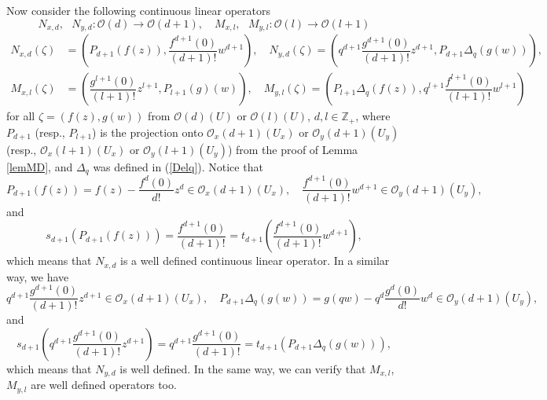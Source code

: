 \documentclass[12pt,reqno]{amsart}%
\theoremstyle{plain}
\numberwithin{theorem}{section} \numberwithin{equation}{section}
\numberwithin{lemma}{section}
\numberwithin{remark}{section}
\numberwithin{example}{section}
\numberwithin{proposition}{section}
\numberwithin{definition}{section}
\numberwithin{corollary}{section}
\begin{document}
Now consider the following continuous linear operators
\begin{equation}
N_{x,d},\text{ }N_{y,d}:\mathcal{O}\left(  d\right)  \rightarrow
\mathcal{O}\left(  d+1\right)  ,\quad M_{x,l},\text{ }M_{y,l}:\mathcal{O}%
\left(  l\right)  \rightarrow\mathcal{O}\left(  l+1\right)  \label{Nd}%
\end{equation}%
\begin{align*}
N_{x,d}\left(  \zeta\right)   &  =\left(  P_{d+1}\left(  f\left(  z\right)
\right)  ,\dfrac{f^{d+1}\left(  0\right)  }{\left(  d+1\right)  !}%
w^{d+1}\right)  ,\quad N_{y,d}\left(  \zeta\right)  =\left(  q^{d+1}%
\dfrac{g^{d+1}\left(  0\right)  }{\left(  d+1\right)  !}z^{d+1},P_{d+1}%
\Delta_{q}\left(  g\left(  w\right)  \right)  \right)  ,\\
M_{x,l}\left(  \zeta\right)   &  =\left(  \dfrac{g^{l+1}\left(  0\right)
}{\left(  l+1\right)  !}z^{l+1},P_{l+1}\left(  g\right)  \left(  w\right)
\right)  ,\quad M_{y,l}\left(  \zeta\right)  =\left(  P_{l+1}\Delta_{q}\left(
f\left(  z\right)  \right)  ,q^{l+1}\dfrac{f^{l+1}\left(  0\right)  }{\left(
l+1\right)  !}w^{l+1}\right)
\end{align*}
for all $\zeta=\left(  f\left(  z\right)  ,g\left(  w\right)  \right)  $ from
$\mathcal{O}\left(  d\right)  \left(  U\right)  $ or $\mathcal{O}\left(
l\right)  \left(  U\right)  $, $d,l\in\mathbb{Z}_{+}$, where $P_{d+1}$ (resp.,
$P_{l+1}$) is the projection onto $\mathcal{O}_{x}\left(  d+1\right)  \left(
U_{x}\right)  $ or $\mathcal{O}_{y}\left(  d+1\right)  \left(  U_{y}\right)  $
(resp., $\mathcal{O}_{x}\left(  l+1\right)  \left(  U_{x}\right)  $ or
$\mathcal{O}_{y}\left(  l+1\right)  \left(  U_{y}\right)  $) from the proof of
Lemma \ref{lemMD}, and $\Delta_{q}$ was defined in (\ref{Delq}). Notice that
\[
P_{d+1}\left(  f\left(  z\right)  \right)  =f\left(  z\right)  -\dfrac
{f^{d}\left(  0\right)  }{d!}z^{d}\in\mathcal{O}_{x}\left(  d+1\right)
\left(  U_{x}\right)  ,\quad\dfrac{f^{d+1}\left(  0\right)  }{\left(
d+1\right)  !}w^{d+1}\in\mathcal{O}_{y}\left(  d+1\right)  \left(
U_{y}\right)  ,
\]
and
\[
s_{d+1}\left(  P_{d+1}\left(  f\left(  z\right)  \right)  \right)
=\dfrac{f^{d+1}\left(  0\right)  }{\left(  d+1\right)  !}=t_{d+1}\left(
\dfrac{f^{d+1}\left(  0\right)  }{\left(  d+1\right)  !}w^{d+1}\right)  ,
\]
which means that $N_{x,d}$ is a well defined continuous linear operator. In a
similar way, we have
\[
q^{d+1}\dfrac{g^{d+1}\left(  0\right)  }{\left(  d+1\right)  !}z^{d+1}%
\in\mathcal{O}_{x}\left(  d+1\right)  \left(  U_{x}\right)  ,\quad
P_{d+1}\Delta_{q}\left(  g\left(  w\right)  \right)  =g\left(  qw\right)
-q^{d}\dfrac{g^{d}\left(  0\right)  }{d!}w^{d}\in\mathcal{O}_{y}\left(
d+1\right)  \left(  U_{y}\right)  ,
\]
and
\[
s_{d+1}\left(  q^{d+1}\dfrac{g^{d+1}\left(  0\right)  }{\left(  d+1\right)
!}z^{d+1}\right)  =q^{d+1}\dfrac{g^{d+1}\left(  0\right)  }{\left(
d+1\right)  !}=t_{d+1}\left(  P_{d+1}\Delta_{q}\left(  g\left(  w\right)
\right)  \right)  ,
\]
which means that $N_{y,d}$ is well defined. In the same way, we can verify
that $M_{x,l}$, $M_{y,l}$ are well defined operators too.
\end{document}
